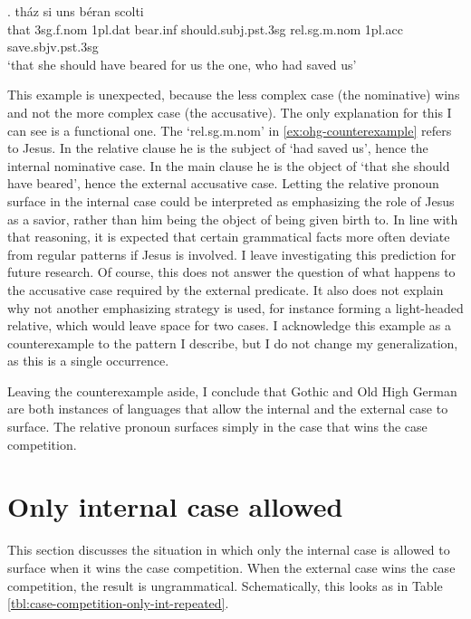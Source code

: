 \exg. tház si uns béran scolti   \\
 that 3\ac{sg}.\ac{f}.\ac{nom} 1\ac{pl}.\ac{dat} bear.\ac{inf}\scsub{[acc]} should.\ac{subj}.\ac{pst}.3\ac{sg} \ac{rel}.\ac{sg}.\ac{m}.\ac{nom} 1\ac{pl}.\ac{acc} save.\ac{sbjv}.\ac{pst}.3\ac{sg}\scsub{[nom]}\\
 `that she should have beared for us the one, who had saved us' \label{ex:ohg-counterexample}

This example is unexpected, because the less complex case (the nominative) wins and not the more complex case (the accusative).
The only explanation for this I can see is a functional one. The  `\ac{rel}.\ac{sg}.\ac{m}.\ac{nom}' in \ref{ex:ohg-counterexample} refers to Jesus. In the relative clause he is the subject of  `had saved us', hence the internal nominative case. In the main clause he is the object of  `that she should have beared', hence the external accusative case.
Letting the relative pronoun surface in the internal case could be interpreted as emphasizing the role of Jesus as a savior, rather than him being the object of being given birth to. In line with that reasoning, it is expected that certain grammatical facts more often deviate from regular patterns if Jesus is involved. I leave investigating this prediction for future research.
Of course, this does not answer the question of what happens to the accusative case required by the external predicate. It also does not explain why not another emphasizing strategy is used, for instance forming a light-headed relative, which would leave space for two cases.
I acknowledge this example as a counterexample to the pattern I describe, but I do not change my generalization, as this is a single occurrence.

Leaving the counterexample aside, I conclude that Gothic and Old High German are both instances of languages that allow the internal and the external case to surface. The relative pronoun surfaces simply in the case that wins the case competition.


\section{Only internal case allowed}\label{sec:pattern-ii}

This section discusses the situation in which only the internal case is allowed to surface when it wins the case competition. When the external case wins the case competition, the result is ungrammatical. Schematically, this looks as in Table \ref{tbl:case-competition-only-int-repeated}.

